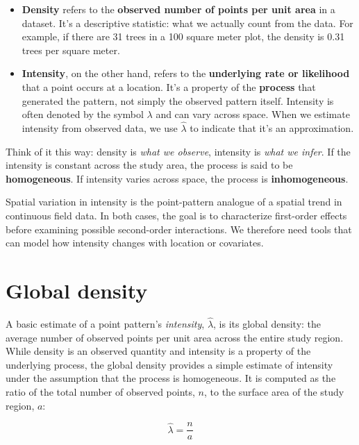\documentclass[
  letterpaper,
]{book}
\begin{document}
\begin{itemize}
\item
  \textbf{Density} refers to the \textbf{observed number of points per
  unit area} in a dataset. It's a descriptive statistic: what we
  actually count from the data. For example, if there are 31 trees in a
  100 square meter plot, the density is 0.31 trees per square meter.
\item
  \textbf{Intensity}, on the other hand, refers to the
  \textbf{underlying rate or likelihood} that a point occurs at a
  location. It's a property of the \textbf{process} that generated the
  pattern, not simply the observed pattern itself. Intensity is often
  denoted by the symbol \(\lambda\) and can vary across space. When we
  estimate intensity from observed data, we use \(\widehat{\lambda}\) to
  indicate that it's an approximation.
\end{itemize}

Think of it this way: density is \emph{what we observe}, intensity is
\emph{what we infer}. If the intensity is constant across the study
area, the process is said to be \textbf{homogeneous}. If intensity
varies across space, the process is \textbf{inhomogeneous}.

Spatial variation in intensity is the point-pattern analogue of a
spatial trend in continuous field data. In both cases, the goal is to
characterize first-order effects before examining possible second-order
interactions. We therefore need tools that can model how intensity
changes with location or covariates.

\section{Global density}\label{global-density}

A basic estimate of a point pattern's \emph{intensity},
\(\widehat{\lambda}\), is its global density: the average number of
observed points per unit area across the entire study region. While
density is an observed quantity and intensity is a property of the
underlying process, the global density provides a simple estimate of
intensity under the assumption that the process is homogeneous. It is
computed as the ratio of the total number of observed points, \(n\), to
the surface area of the study region, \(a\):

\begin{equation}
\widehat{\lambda} = \frac{n}{a}
\label{eq:global-density}
\end{equation}
\end{document}
